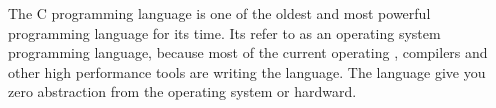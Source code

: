 \documentclass{article}
\begin{document}
  The C programming language is one of the oldest and most powerful programming language for its time. 
  Its refer to as an operating system programming language, because most of the current operating , compilers and other high performance tools are writing 
  the language. The language give you zero abstraction from the operating system or hardward.
\end{document}

